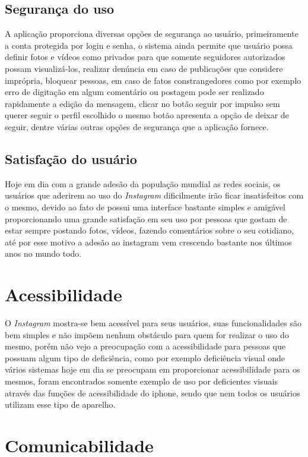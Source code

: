 \documentclass[
	12pt,				%
	openright,			%
	oneside,			%
	a4paper,			%
	english,			%
	french,				%
	spanish,			%
	brazil,				%
	]{abntex2}
\begin{document}
\subsection{Segurança do uso}

A aplicação proporciona diversas opções de segurança ao usuário, primeiramente a conta protegida por login e senha, o sistema ainda permite que usuário possa definir fotos e vídeos como privados para que somente seguidores autorizados possam visualizá-los, realizar denúncia em caso de publicações que considere imprópria, bloquear pessoas, em caso de fatos constrangedores como por exemplo erro de digitação em algum comentário ou postagem pode ser realizado rapidamente a edição da mensagem, clicar no botão seguir por impulso sem querer seguir o perfil escolhido o mesmo botão apresenta a opção de deixar de seguir, dentre várias outras opções de segurança que a aplicação fornece.

\subsection{Satisfação do usuário}

Hoje em dia com a grande adesão da população mundial as redes sociais, os usuários que aderirem ao uso do \textit{Instagram} dificilmente irão ficar insatisfeitos com o mesmo, devido ao fato de possui uma interface bastante simples e amigável proporcionando uma grande satisfação em seu uso por pessoas que gostam de estar sempre postando fotos, vídeos, fazendo comentários sobre o seu cotidiano, até por esse motivo a adesão ao instagram vem crescendo bastante nos últimos anos no mundo todo.

\section{Acessibilidade}

O \textit{Instagram} mostra-se bem acessível para seus usuários, suas funcionalidades são bem simples e não impõem nenhum obstáculo para quem for realizar o uso do mesmo, porém não vejo a preocupação com a acessibilidade para pessoas que possuam algum tipo de deficiência, como por exemplo deficiência visual onde vários sistemas hoje em dia se preocupam em proporcionar acessibilidade para os mesmos, foram encontrados somente exemplo de uso por deficientes visuais através das funções de acessibilidade do iphone, sendo que nem todos os usuários utilizam esse tipo de aparelho.

\section{Comunicabilidade}
\end{document}
